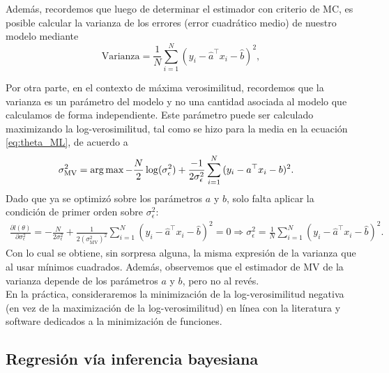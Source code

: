 Además, recordemos que luego de determinar el estimador con criterio de MC, es posible calcular la varianza de los errores (error cuadrático medio) de nuestro modelo mediante 
\begin{equation}
	\text{Varianza} = \frac{1}{N}\sum_{i=1}^N (y_i-\hat{a}^\top x_i -\hat{b})^2,
\end{equation}

Por otra parte, en el contexto de máxima verosimilitud, recordemos que la varianza es un parámetro del modelo y no una cantidad asociada al modelo que calculamos de forma independiente. Este parámetro puede ser calculado maximizando la log-verosimilitud, tal como se hizo para la media en la ecuación \eqref{eq:theta_ML}, de acuerdo a
\begin{align}
	\sigma^2_{\text{MV}} &= \operatorname*{arg\,max} -\frac{N}{2} \log(\sigma_\epsilon^{2}) + \frac{-1}{2\sigma_\epsilon^2}\sum_{i=1}^N {(y_i-a^\top x_i -b)^2}. \label{eq:sigma_ML}
\end{align}
Dado que ya se optimizó sobre los parámetros $a$ y $b$, solo falta aplicar  la condición de primer orden sobre $\sigma_\epsilon^2$:
\begin{align}
	\frac{\partial l(\theta)}{\partial \sigma_\epsilon^2} = -\frac{N}{2\sigma_\epsilon^2} + \frac{1}{2(\sigma^2_{\text{MV}})^2}\sum_{i=1}^N {(y_i-\hat{a}^\top x_i -\hat{b})^2} = 0 \Rightarrow \sigma_\epsilon^2 = \frac{1}{N}\sum_{i=1}^N {(y_i-\hat{a}^\top x_i -\hat{b})^2}.
\end{align}
Con lo cual se obtiene, sin sorpresa alguna, la misma expresión de la varianza que al usar mínimos cuadrados. Además, observemos que el estimador de MV de la varianza depende de los parámetros $a$ y $b$, pero no al revés.\\

En la práctica, consideraremos la minimización de la log-verosimilitud negativa (en vez de la maximización de la log-verosimilitud) en línea con la literatura y software dedicados a la minimización de funciones. 

\subsection{Regresión vía inferencia bayesiana} 
\label{sub:inferencia_bayes}

